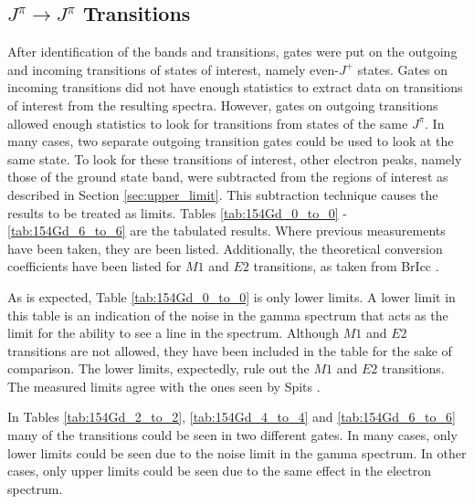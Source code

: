 

\subsection{$J^{\pi}\rightarrow J^{\pi}$ Transitions}

After identification of the bands and transitions, gates were put on the outgoing and incoming transitions of states of interest, namely even-$J^{+}$ states. Gates on incoming transitions did not have enough statistics to extract data on transitions of interest from the resulting spectra. However, gates on outgoing transitions allowed enough statistics to look for transitions from states of the same $J^{\pi}$. In many cases, two separate outgoing transition gates could be used to look at the same state. To look for these transitions of interest, other electron peaks, namely those of the ground state band, were subtracted from the regions of interest as described in Section \ref{sec:upper_limit}. This subtraction technique causes the results to be treated as limits. Tables \ref{tab:154Gd_0_to_0} - \ref{tab:154Gd_6_to_6} are the tabulated results. Where previous measurements have been taken, they are been listed. Additionally, the theoretical conversion coefficients have been listed for $M1$ and $E2$ transitions, as taken from BrIcc \cite{kibedi08:_BRICC}.

\afterpage{\clearpage}

As is expected, Table \ref{tab:154Gd_0_to_0} is only lower limits. A lower limit in this table is an indication of the noise in the gamma spectrum that acts as the limit for the ability to see a line in the spectrum. Although $M1$ and $E2$ transitions are not allowed, they have been included in the table for the sake of comparison.  The lower limits, expectedly, rule out the $M1$ and $E2$ transitions. The measured limits agree with the ones seen by Spits \cite{spits96:_154gd}.

\afterpage{\clearpage}

In Tables \ref{tab:154Gd_2_to_2}, \ref{tab:154Gd_4_to_4} and \ref{tab:154Gd_6_to_6} many of the transitions could be seen in two different gates. In many cases, only lower limits could be seen due to the noise limit in the gamma spectrum.  In other cases, only upper limits could be seen due to the same effect in the electron spectrum.

\afterpage{\clearpage}

